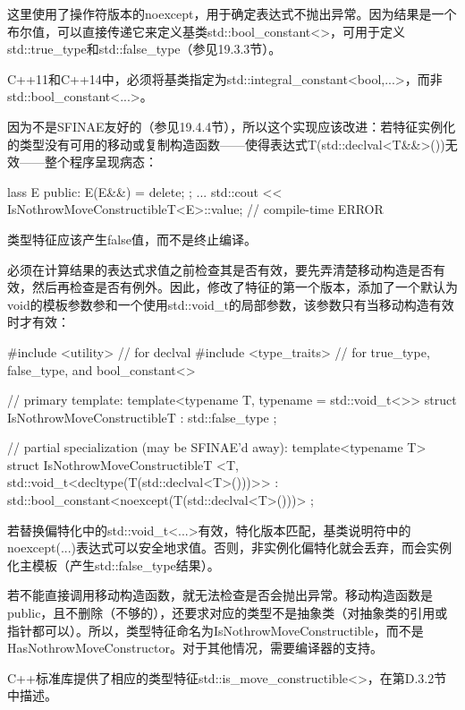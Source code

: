 这里使用了操作符版本的noexcept，用于确定表达式不抛出异常。因为结果是一个布尔值，可以直接传递它来定义基类std::bool\_constant<>，可用于定义std::true\_type和std::false\_type（参见19.3.3节）。

\begin{notice}
C++11和C++14中，必须将基类指定为std::integral\_constant<bool,...>，而非std::bool\_constant<...>。
\end{notice}

因为不是SFINAE友好的（参见19.4.4节），所以这个实现应该改进：若特征实例化的类型没有可用的移动或复制构造函数——使得表达式T(std::declval<T\&\&>())无效——整个程序呈现病态：

\begin{cpp}
lass E {
	public:
	E(E&&) = delete;
};
...
std::cout << IsNothrowMoveConstructibleT<E>::value; // compile-time ERROR
\end{cpp}

类型特征应该产生false值，而不是终止编译。

必须在计算结果的表达式求值之前检查其是否有效，要先弄清楚移动构造是否有效，然后再检查是否有例外。因此，修改了特征的第一个版本，添加了一个默认为void的模板参数参和一个使用std::void\_t的局部参数，该参数只有当移动构造有效时才有效：

\begin{cpp}
#include <utility> // for declval
#include <type_traits> // for true_type, false_type, and bool_constant<>

// primary template:
template<typename T, typename = std::void_t<>>
struct IsNothrowMoveConstructibleT : std::false_type
{
};

// partial specialization (may be SFINAE'd away):
template<typename T>
struct IsNothrowMoveConstructibleT
		<T, std::void_t<decltype(T(std::declval<T>()))>>
: std::bool_constant<noexcept(T(std::declval<T>()))>
{
};
\end{cpp}

若替换偏特化中的std::void\_t<...>有效，特化版本匹配，基类说明符中的noexcept(...)表达式可以安全地求值。否则，非实例化偏特化就会丢弃，而会实例化主模板（产生std::false\_type结果）。

若不能直接调用移动构造函数，就无法检查是否会抛出异常。移动构造函数是public，且不删除（不够的），还要求对应的类型不是抽象类（对抽象类的引用或指针都可以）。所以，类型特征命名为IsNothrowMoveConstructible，而不是HasNothrowMoveConstructor。对于其他情况，需要编译器的支持。 

C++标准库提供了相应的类型特征std::is\_move\_constructible<>，在第D.3.2节中描述。

